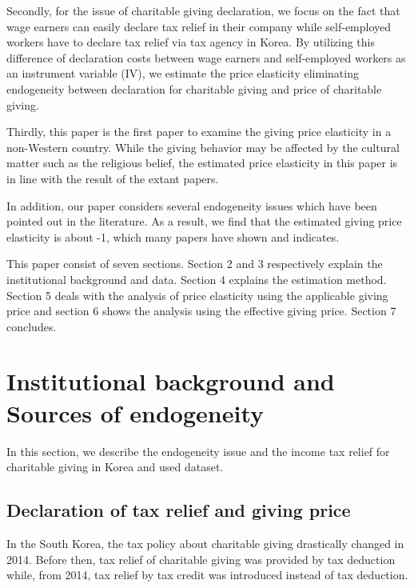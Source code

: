 \documentclass[
  11pt,
  a4paper,
]{article}
\begin{document}
Secondly, for the issue of charitable giving declaration, we focus on the fact that wage earners can easily declare tax relief in their company while self-employed workers have to declare tax relief via tax agency in Korea. By utilizing this difference of declaration costs between wage earners and self-employed workers as an instrument variable (IV), we estimate the price elasticity eliminating endogeneity between declaration for charitable giving and price of charitable giving.

Thirdly, this paper is the first paper to examine the giving price elasticity in a non-Western country. While the giving behavior may be affected by the cultural matter such as the religious belief, the estimated price elasticity in this paper is in line with the result of the extant papers.

In addition, our paper considers several endogeneity issues which have been pointed out in the literature. As a result, we find that the estimated giving price elasticity is about -1, which many papers have shown and indicates.

This paper consist of seven sections. Section 2 and 3 respectively explain the institutional background and data. Section 4 explains the estimation method. Section 5 deals with the analysis of price elasticity using the applicable giving price and section 6 shows the analysis using the effective giving price. Section 7 concludes.

\hypertarget{institutional-background-and-sources-of-endogeneity}{%
\section{Institutional background and Sources of endogeneity}\label{institutional-background-and-sources-of-endogeneity}}

In this section, we describe the endogeneity issue and the income tax relief for charitable giving in Korea and used dataset.

\hypertarget{declaration-of-tax-relief-and-giving-price}{%
\subsection{Declaration of tax relief and giving price}\label{declaration-of-tax-relief-and-giving-price}}

In the South Korea, the tax policy about charitable giving drastically changed in 2014. Before then, tax relief of charitable giving was provided by tax deduction while, from 2014, tax relief by tax credit was introduced instead of tax deduction.
\end{document}

